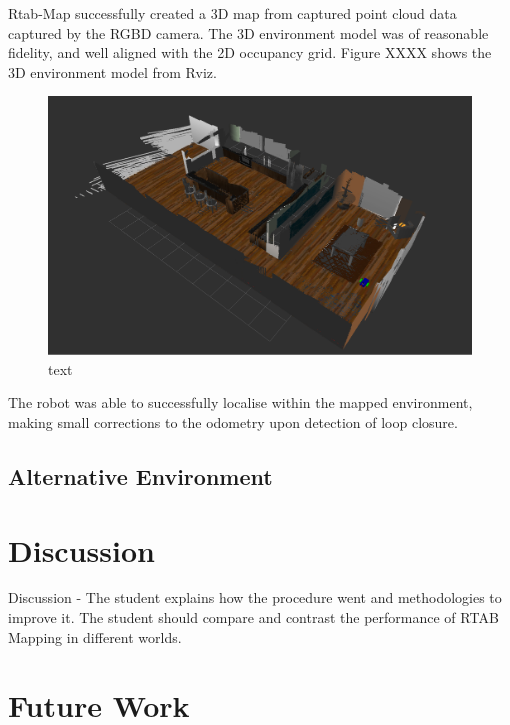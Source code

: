 \documentclass[a4paper]{article}
\begin{document}
Rtab-Map successfully created a 3D map from captured point cloud data captured by the RGBD camera. The 3D environment model was of reasonable fidelity, and well aligned with the 2D occupancy grid. Figure XXXX shows the 3D environment model from Rviz.
\begin{figure}[h]
\centering
\includegraphics[scale=0.28]{kitchen_3d_map_2}
\caption{text}
\end{figure}

The robot was able to successfully localise within the mapped environment, making small corrections to the odometry upon detection of loop closure.

\subsection{Alternative Environment}

\section{Discussion}
Discussion - The student explains how the procedure went and methodologies to improve it. The student should compare and contrast the performance of RTAB Mapping in different worlds.


\section{Future Work}




\end{document}
